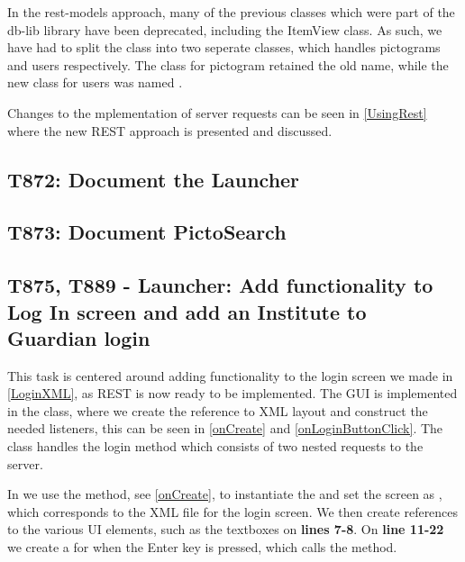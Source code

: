 In the rest-models approach, many of the previous classes which were part of
the db-lib library have been deprecated, including the ItemView class. As such,
we have had to split the  class into two seperate
classes, which handles pictograms and users respectively. The class for
pictogram retained the old name, while the new class for users was named
.\nl

Changes to the mplementation of server requests can be seen in
\autoref{UsingRest} where the new REST approach is presented and discussed.

\subsection{T872: Document the Launcher}

\subsection{T873: Document PictoSearch}

\subsection{T875, T889 - Launcher: Add functionality to Log In screen and add an
Institute to Guardian login}

This task is centered around adding functionality to the login screen we made
in \autoref{LoginXML}, as REST is now ready to be implemented. The GUI is
implemented in the  class, where we create the reference
to XML layout and construct the needed listeners, this can be seen in
\autoref{onCreate} and \autoref{onLoginButtonClick}. The 
class handles the login method which consists of two nested requests to the
server.\nl

In  we use the  method, see
\autoref{onCreate}, to instantiate the  and set the
screen as , which corresponds to the XML
file for the login screen. We then create references to the various UI elements,
such as the textboxes on \textbf{lines 7-8}. On \textbf{line 11-22} we create a
 for when the Enter key is pressed, which calls the
 method.\nl

